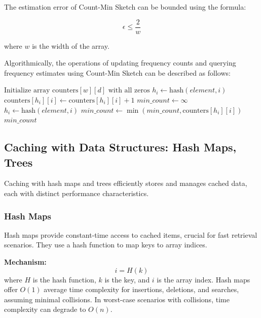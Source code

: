 \documentclass[12pt]{book} %
\begin{document}
The estimation error of Count-Min Sketch can be bounded using the formula:

\[
\epsilon \leq \frac{2}{w}
\]

where \(w\) is the width of the array.

Algorithmically, the operations of updating frequency counts and querying frequency estimates using Count-Min Sketch can be described as follows:
\FloatBarrier
\begin{algorithm}[H]
\caption{Count-Min Sketch Operations}
\begin{algorithmic}[1]
\State $\text{Initialize array } \text{counters}[w][d] \text{ with all zeros}$
        \State $h_i \gets \text{hash}(element, i)$ 
        \State $\text{counters}[h_i][i] \gets \text{counters}[h_i][i] + 1$ 
    \EndFor
\EndProcedure
{}
    \State $min\_count \gets \infty$
        \State $h_i \gets \text{hash}(element, i)$ 
        \State $min\_count \gets \min(min\_count, \text{counters}[h_i][i])$ 
    \EndFor
    \State \Return $min\_count$
\EndProcedure
\end{algorithmic}
\end{algorithm}
\FloatBarrier

\subsection{Caching with Data Structures: Hash Maps, Trees}

Caching with hash maps and trees efficiently stores and manages cached data, each with distinct performance characteristics.

\subsubsection{Hash Maps}

Hash maps provide constant-time access to cached items, crucial for fast retrieval scenarios. They use a hash function to map keys to array indices.

\textbf{Mechanism:} 
\[ i = H(k) \]
where \(H\) is the hash function, \(k\) is the key, and \(i\) is the array index. Hash maps offer \(O(1)\) average time complexity for insertions, deletions, and searches, assuming minimal collisions. In worst-case scenarios with collisions, time complexity can degrade to \(O(n)\).
\end{document}
